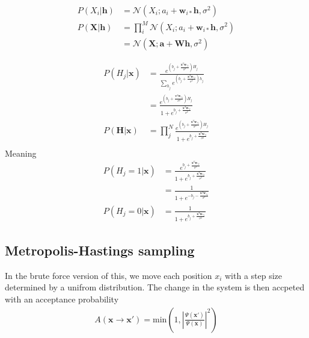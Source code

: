 \documentclass[norsk,a4paper,11pt]{article}
\newcommand{\Vx}{\mathbf{x}}
\begin{document}
\begin{align}
	P(X_i|\mathbf{h}) &= \mathcal{N}(X_i; a_i+\mathbf{w}_{i*} \mathbf{h}, \sigma^2) \\
	P(\mathbf{X}|\mathbf{h}) &= \prod_i^M \mathcal{N}(X_i; a_i+\mathbf{w}_{i*} \mathbf{h}, \sigma^2) \\
	&= \mathcal{N} (\mathbf{X}; \mathbf{a}+\mathbf{W}\mathbf{h},\sigma^2)
\end{align}

\begin{align}
	P(H_j|\mathbf{x}) &= \frac{e^{(b_j+\frac{\mathbf{x}^T\mathbf{w}_{*j}}{\sigma^2})H_j}}{\sum_{h_j}e^{(b_j+\frac{\mathbf{x}^T\mathbf{w}_{*j}}{\sigma^2})h_j}} \\
	&= \frac{e^{(b_j+\frac{\mathbf{v}^T\mathbf{w}_{*j}}{\sigma^2})H_j}}{1+e^{b_j+\frac{\mathbf{x}^T\mathbf{w}_{*j}}{\sigma^2}}} \\
	P(\mathbf{H}|\mathbf{x}) &= \prod_j^N \frac{e^{(b_j+\frac{\mathbf{x}^T\mathbf{w}_{*j}}{\sigma^2})H_j}}{1+e^{b_j+\frac{\mathbf{x}^T\mathbf{w}_{*j}}{\sigma^2}}} \\
\end{align}
Meaning
\begin{align}
	P(H_j=1|\mathbf{x}) &= \frac{e^{b_j+\frac{\mathbf{x}^T\mathbf{w}_{*j}}{\sigma^2}}}{1+e^{b_j+\frac{\mathbf{x}^T\mathbf{w}_{*j}}{\sigma^2}}} \\
	&= \frac{1}{1+e^{-b_j-\frac{\mathbf{x}^T\mathbf{w}_{*j}}{\sigma^2}}} \\
	P(H_j=0|\mathbf{x}) &= \frac{1}{1+e^{b_j+\frac{\mathbf{x}^T\mathbf{w}_{*j}}{\sigma^2}}} 
\end{align}

\subsection{Metropolis-Hastings sampling}
In the brute force version of this, we move each position $x_i$ with a step size determined by a unifrom distribution. The change in the system is then accpeted with an acceptance probability
\begin{align}
	A (\Vx \rightarrow \Vx') = \text{min}(1, |\frac{\Psi(\Vx')}{\Psi(\Vx)}|^2)
\end{align}

%

\end{document}
